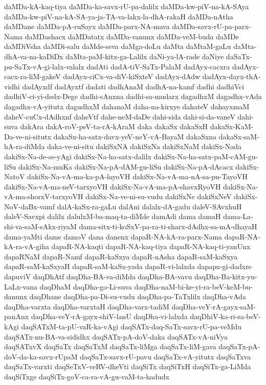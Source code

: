 {daMDa-kA-kaq-tiya
daMDa-ka-savx-rU-pa-dalilx
daMDa-kw-piV-na-kA-SAya
daMDa-kw-piV-na-kA-SA-ya-ja-TA-va-lakx-la-dhA-rakaH
daMDa-nAtha
daMDane
daMDa-pA-ruSayx
daMDa-parx-NA-mava
daMDa-savx-rU-pa-parx-Nama
daMDashacx
daMDatatx
daMDa-vanunx
daMDa-veM-buda
daMDe
daMDiVsha
daMDi-salu
daMde-seva
daMga-doLu
daMta
daMtaM-gaLu
daMta-dhA-va-na-kaDiDx
daMta-paM-kitx-ga-Lalilx
daNi-ya-lA-rade
daNiye
daSaTx-pu-SaTx-vA-gi-lalx-valalx
dadAti
dadA-tiV-SaTx-PalaM
dadAyx-cacxra
dadAyx-cacx-ra-liM-gakeV
dadAyx-ciCx-va-diV-kiSxteV
dadAyx-dAdw
dadAyx-dayx-thA-vidhi
dadAyxdf
dadAyxtf
dadati
dadhAnaM
dadhA-na-kamf
dadhi
dadhiVci
dadhiV-ci-yi-dedx-Dege
dadhi-sAnxna
dadhi-sa-mudarx
dagadhxM
dagadhx-vAda
dagadhx-vA-yitutx
dagudhxM
dahanaM
daha-na-kirxye
dahateV
dahayxmaM
daheV-cuCx-dAdhxnf
daheVtf
dahe-neM-daDe
dahi-sida
dahi-si-da-vaneV
dahi-suva
dakAra
dakA-roV-peV-ta-rA-kAraM
daka
dakaSx
dakaSxH
dakaSx-KaM-Da-ve-ni-situtx
dakaSx-ha-satx-davx-yeV-neY-vA-BayaM
dakaSxna
dakaSx-saM-hA-ra-diMda
daka-ve-ni-situ
dakiSxNA
dakiSxNa
dakiSxNaM
dakiSx-Nada
dakiSx-Na-de-se-yAgi
dakiSx-Na-ha-satx-dalilx
dakiSx-Na-ha-satx-paM-cAM-gu-liSu
dakiSx-Na-muKa
dakiSx-Na-pA-dAM-gu-liSu
dakiSx-Na-pA-dAcacx
dakiSx-NatoV
dakiSx-Na-vA-ma-ka-pA-layoVH
dakiSx-Na-vA-ma-nA-sa-pu-TayoVH
dakiSx-Na-vA-ma-neV-tarxyoVH
dakiSx-Na-vA-ma-pA-shavxRyoVH
dakiSx-Na-vA-ma-shorxV-tarxyoVH
dakiSx-Na-ve-ni-su-vudu
dakiSxNe
dakiSxNeV
dakiSx-NoV-daBx-vamf
dalA-kaSx-ra-gaLu
dalAni
dalalx-dA-gadu
daleV-SAvxhuH
daleV-Savxpi
dalilx
dalulxM-ba-maq-ta-diMde
damAdi
dama
damaH
dama-La-shi-va-saM-sAkx-riyaM
dama-sitx-ti-koSxV-pa-ra-ti-sharx-dAdhx-sa-mA-dhayaH
dama-yaMti
dame
damoV
dana
danenx
dapaR-NA-kA-ra-parx-Nama
dapaR-NA-kA-ra-vA-giha
dapaR-NA-kaqti
dapaR-NA-kaq-tiya
dapaR-NA-kaq-ti-yanUnx
dapaRNaM
dapaR-Namf
dapaR-kaSxya
dapaR-nAsha
dapaR-saM-kaSxya
dapaR-saM-kaSxyaH
dapaR-saM-kaSx-yada
dapaR-vi-lalxda
dapapx-gi-dadxre
dapuviV
daqDhAtf
daqDha-BA-va-diMda
daqDha-BA-vavu
daqDha-Ba-kitx-yu-LaLx-vana
daqDhaM
daqDha-go-Li-suva
daqDha-naM-bi-ke-yi-ra-beV-keM-bu-danunx
daqDhane
daqDha-pa-Di-su-vudu
daqDha-pa-TaTxlilx
daqDha-vAda
daqDha-varxta
daqDha-varxtaH
daqDha-varx-tadiM
daqDha-veY-rA-gayx-saM-panAnx
daqDha-veY-rA-gayx-shiV-lanU
daqDha-vi-lalxda
daqDhiV-ka-ri-sa-beV-kAgi
daqSATxM-ta-pU-vaR-ka-vAgi
daqSATx-daq-SaTx-savx-rU-pa-veMdu
daqSATx-nu-BA-va-sididhx
daqSATx-pA-doV-daka
daqSATx-vA-niVya
daqSATxvX
daqSaTx
daqSaTxM
daqSaTx-liMga
daqSaTx-liM-gava
daqSaTx-pA-doV-da-ka-savx-rUpaM
daqSaTx-savx-rU-pavu
daqSaTx-vA-yitutx
daqSaTxva
daqSaTx-varxti
daqSeTxV-veRV-dheVti
daqSiTx
daqSiTxH
daqSiTx-ga-LiMda
daqSiTxge
daqSiTx-goV-ca-ra-vA-gu-vaM-ta-hadudx
}
